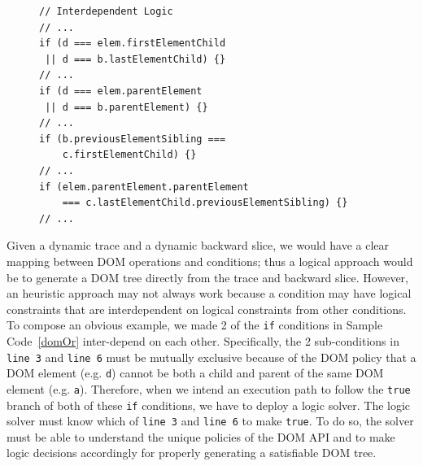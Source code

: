 \begin{figure}
\begin{lstlisting}[caption=Example code showing how DOM operations can have logical constraints that are interdependent with each other: {\tt line 3} and {\tt line 6}.  To make all these {\tt if} statements {\tt true} the sub conditions in {\tt line 3} and {\tt line 6} become mutually exclusive: they cannot be {\tt true} at the same time because {\tt d} cannot be both a parent and a child of the same DOM element {\tt elem}.  A logic solver is required to generate a satisfiable DOM tree.  Note that the final 2 conditions ({\tt line 9} and {\tt line 12}) would collectively influence the DOM solver to decide which sub condition ({\tt line 3} vs. {\tt line 6}) to become {\tt true}.,label=domOr]  
// Interdependent Logic
// ...
if (d === elem.firstElementChild
 || d === b.lastElementChild) {}
// ... 
if (d === elem.parentElement
 || d === b.parentElement) {}
// ...
if (b.previousElementSibling === 
    c.firstElementChild) {}
// ... 
if (elem.parentElement.parentElement 
    === c.lastElementChild.previousElementSibling) {}  
// ... 
\end{lstlisting}
\end{figure}


Given a dynamic trace and a dynamic backward slice, we would have a clear mapping between DOM operations and conditions; 
thus a logical approach would be to generate a DOM tree directly from the trace and backward slice.  
However, an heuristic approach may not always work because a condition may have logical constraints that are interdependent on logical constraints from other conditions.  
To compose an obvious example, we made 2 of the {\tt if} conditions in Sample Code~\ref{domOr} inter-depend on each other.
Specifically, the 2 sub-conditions in {\tt line 3} and {\tt line 6} must be mutually exclusive because of the DOM policy that a DOM element (e.g. {\tt d}) cannot be both a child and parent of the same DOM element (e.g. {\tt a}).  
Therefore, when we intend an execution path to follow the {\tt true} branch of both of these {\tt if} conditions, we have to deploy a logic solver.  
The logic solver must know which of {\tt line 3} and {\tt line 6} to make {\tt true}.  
To do so, the solver must be able to understand the unique policies of the DOM API and to make logic decisions accordingly for properly generating a satisfiable DOM tree.  


